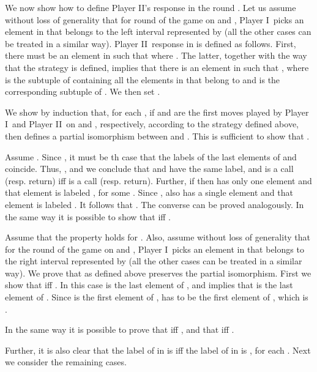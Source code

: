 \documentclass{LMCS}
\newcommand{\dupl}{Player II}
\newcommand{\spoiler}{Player I}
\theoremstyle{plain}
\theoremstyle{definition}
\begin{document}
We now show how to define \dupl's response in the round .  Let us
assume without loss of generality that for round  of the game on
 and , \spoiler\ picks an
element  in  that belongs to the left interval
represented by  (all the other cases can be treated in a
similar way). \dupl\ response  in  is defined as
follows. First, there must be an element  in 
such that  where
. The latter, together with the way that the
strategy is defined, implies that there is an element  in 
such that , where  is the subtuple of
 containing all the elements in 
that belong to  and  is the corresponding
subtuple of . We then set .

We show by induction that, for each , if 
and  are the first  moves played by \spoiler\ and
\dupl\ on  and ,
respectively, according to the strategy defined above, then
 defines a partial isomorphism
between  and . This is
sufficient to show
 that .
  
Assume . Since , it must be th case that the labels of the last
elements of  and  coincide.
Thus, , and we conclude that  and
 have the same label, and  is a call (resp. return) iff  is
a call (resp. return). Further, if  then 
has only one element and that element is 
   labeled , for some . Since
   ,
    also has a single element and that element is
   labeled
   . It follows that . The converse can be
   proved analogously. In the same way it is possible to show that  iff .


Assume that the property holds for . Also, assume without loss of
generality that for the round  of the game on
 and , \spoiler\ picks an
element  in  that belongs to the right interval
represented by  (all the other cases can be treated in a
similar way). We prove that  as defined above preserves the
partial isomorphism.  First we show that  iff . In this case  is the last element of
, and  implies that  is the last element of
. Since  is the first element of
,  has to be the first element of ,
which is .  

In the same way it is possible to prove that  iff
, and that  iff .


Further, it is also clear that the label of  in  is 
iff the label of  in  is , for each . Next we consider the remaining cases.
\end{document}

